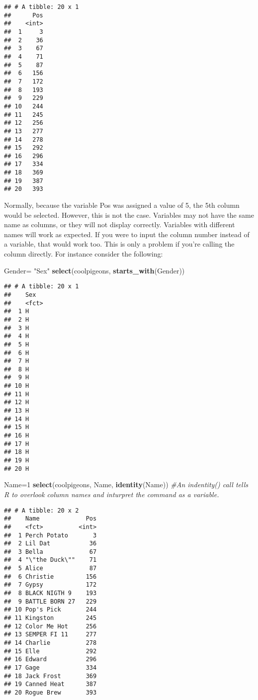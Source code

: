 \documentclass[]{article}
\newenvironment{Shaded}{\begin{snugshade}}{\end{snugshade}}
\newcommand{\KeywordTok}[1]{\textcolor[rgb]{0.13,0.29,0.53}{\textbf{#1}}}
\newcommand{\DecValTok}[1]{\textcolor[rgb]{0.00,0.00,0.81}{#1}}
\newcommand{\StringTok}[1]{\textcolor[rgb]{0.31,0.60,0.02}{#1}}
\newcommand{\CommentTok}[1]{\textcolor[rgb]{0.56,0.35,0.01}{\textit{#1}}}
\newcommand{\NormalTok}[1]{#1}
\begin{document}
\begin{verbatim}
## # A tibble: 20 x 1
##      Pos
##    <int>
##  1     3
##  2    36
##  3    67
##  4    71
##  5    87
##  6   156
##  7   172
##  8   193
##  9   229
## 10   244
## 11   245
## 12   256
## 13   277
## 14   278
## 15   292
## 16   296
## 17   334
## 18   369
## 19   387
## 20   393
\end{verbatim}

Normally, because the variable Pos was assigned a value of 5, the 5th
column would be selected. However, this is not the case. Variables may
not have the same name as columns, or they will not display correctly.
Variables with different names will work as expected. If you were to
input the column number instead of a variable, that would work too. This
is only a problem if you're calling the column directly. For instance
consider the following:

\begin{Shaded}
\begin{Highlighting}[]
\NormalTok{Gender=}\StringTok{ "Sex"}
\KeywordTok{select}\NormalTok{(coolpigeons, }\KeywordTok{starts_with}\NormalTok{(Gender))}
\end{Highlighting}
\end{Shaded}

\begin{verbatim}
## # A tibble: 20 x 1
##    Sex  
##    <fct>
##  1 H    
##  2 H    
##  3 H    
##  4 H    
##  5 H    
##  6 H    
##  7 H    
##  8 H    
##  9 H    
## 10 H    
## 11 H    
## 12 H    
## 13 H    
## 14 H    
## 15 H    
## 16 H    
## 17 H    
## 18 H    
## 19 H    
## 20 H
\end{verbatim}

\begin{Shaded}
\begin{Highlighting}[]
\NormalTok{Name=}\DecValTok{1}
\KeywordTok{select}\NormalTok{(coolpigeons, Name, }\KeywordTok{identity}\NormalTok{(Name)) }\CommentTok{#An indentity() call tells R to overlook column names and inturpret the command as a variable. }
\end{Highlighting}
\end{Shaded}

\begin{verbatim}
## # A tibble: 20 x 2
##    Name             Pos
##    <fct>          <int>
##  1 Perch Potato       3
##  2 Lil Dat           36
##  3 Bella             67
##  4 "\"the Duck\""    71
##  5 Alice             87
##  6 Christie         156
##  7 Gypsy            172
##  8 BLACK NIGTH 9    193
##  9 BATTLE BORN 27   229
## 10 Pop's Pick       244
## 11 Kingston         245
## 12 Color Me Hot     256
## 13 SEMPER FI 11     277
## 14 Charlie          278
## 15 Elle             292
## 16 Edward           296
## 17 Gage             334
## 18 Jack Frost       369
## 19 Canned Heat      387
## 20 Rogue Brew       393
\end{verbatim}
\end{document}
